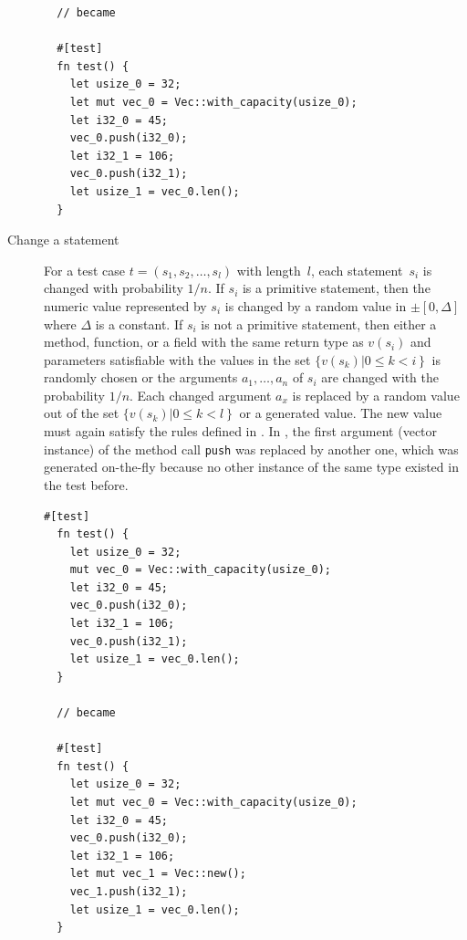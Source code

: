 \documentclass[paper=a4,%
  twoside,%
  BCOR4mm,%
  abstract=true,%
  toc=bibliography,%
  chapterprefix=true,%
  toc=bibliographynumbered,%
  open=right,%
  english,%
  pagesize=pdftex]{scrreprt}
\begin{document}
\begin{description}
\begin{lstlisting}
  // became

  #[test]
  fn test() {
    let usize_0 = 32;
    let mut vec_0 = Vec::with_capacity(usize_0);
    let i32_0 = 45;
    vec_0.push(i32_0);
    let i32_1 = 106;
    vec_0.push(i32_1);
    let usize_1 = vec_0.len();
  }
  \end{lstlisting}

  \item[Change a statement] For a test case $t = (s_1, s_2, \dots, s_l)$ with length~$l$, each statement~$s_i$ is changed with probability $1/n$. If $s_i$ is a primitive statement, then the numeric value represented by $s_i$ is changed by a random value in $\pm[0,\Delta]$ where $\Delta$ is a constant. If $s_i$ is not a primitive statement, then either a method, function, or a field with the same return type as $v(s_i)$ and parameters satisfiable with the values in the set $\{v(s_k) \left| 0 \leq k < i \right\}$ is randomly chosen or the arguments $a_1, \dots, a_n$ of $s_i$ are changed with the probability $1/n$. Each changed argument $a_x$ is replaced by a random value out of the set $\{v(s_k) \left| 0 \leq k < l \right\}$ or a generated value. The new value must again satisfy the rules defined in . In , the first argument (vector instance) of the method call \texttt{push} was replaced by another one, which was generated on-the-fly because no other instance of the same type existed in the test before.

  \begin{lstlisting}[style=boxed, label=lst:mutation-input-value, caption={The first argument (which effectively is the method owner) of the call to \emph{push} (line 8) has been changed to a newly created value \emph{vec\string_1}}]
  #[test]
  fn test() {
    let usize_0 = 32;
    mut vec_0 = Vec::with_capacity(usize_0);
    let i32_0 = 45;
    vec_0.push(i32_0);
    let i32_1 = 106;
    vec_0.push(i32_1);
    let usize_1 = vec_0.len();
  }

  // became

  #[test]
  fn test() {
    let usize_0 = 32;
    let mut vec_0 = Vec::with_capacity(usize_0);
    let i32_0 = 45;
    vec_0.push(i32_0);
    let i32_1 = 106;
    let mut vec_1 = Vec::new();
    vec_1.push(i32_1);
    let usize_1 = vec_0.len();
  }
  \end{lstlisting}


\end{description}
\end{document}
